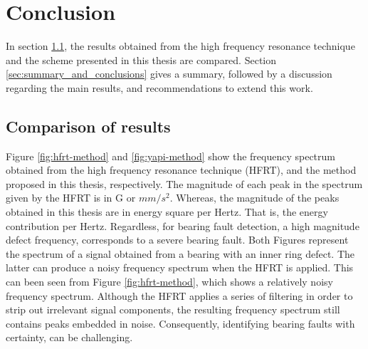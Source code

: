 \documentclass[../Main/thesis.tex]{subfiles}
\begin{document}
	\chapter[Conclusions]{Conclusion}
	\label{sec:conclusions}
	 In section \ref{sec:comp}, the results obtained from the high frequency resonance technique and the scheme presented in this thesis are compared.
	 Section \ref{sec:summary_and_conclusions} gives a summary, followed by a discussion regarding the main results, and recommendations to extend this work.

	
	\section{Comparison of results}
		\label{sec:comp}
	Figure \ref{fig:hfrt-method} and \ref{fig:yapi-method} show the frequency spectrum obtained from the high frequency resonance technique (HFRT), and the method proposed in this thesis, respectively. The magnitude of each peak in the spectrum given by the HFRT is in G or $mm/s^{2}$. Whereas, the magnitude of the peaks obtained in this thesis are in energy square per Hertz. That is, the energy contribution per Hertz. Regardless, for bearing fault detection, a high magnitude defect frequency, corresponds to a severe bearing fault. 
	\justify
	 Both Figures represent the spectrum of a signal obtained from a bearing with an inner ring defect. The latter can produce a noisy frequency spectrum when the HFRT is applied. This can been seen from Figure \ref{fig:hfrt-method}, which shows a relatively noisy frequency spectrum.
	Although the HFRT applies a series of filtering in order to strip out irrelevant signal components, the resulting frequency spectrum still contains  peaks embedded in noise. Consequently, identifying bearing faults with certainty, can be challenging. 
	
\end{document}
